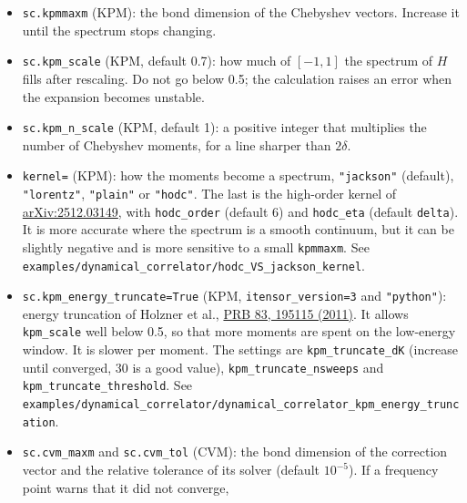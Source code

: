 \documentclass[11pt]{article}
\providecommand{\tightlist}{\setlength{\itemsep}{0pt}\setlength{\parskip}{0pt}}
\begin{document}
\begin{itemize}
\tightlist
\item
  \texttt{sc.\allowbreak{}kpmmaxm} (KPM): the bond dimension of the Chebyshev vectors. Increase
  it until the spectrum stops changing.
\item
  \texttt{sc.\allowbreak{}kpm\_\allowbreak{}scale} (KPM, default 0.7): how much of \([-1,1]\) the spectrum of
  \(H\) fills after rescaling. Do not go below 0.5; the calculation raises an
  error when the expansion becomes unstable.
\item
  \texttt{sc.\allowbreak{}kpm\_\allowbreak{}n\_\allowbreak{}scale} (KPM, default 1): a positive integer that multiplies the
  number of Chebyshev moments, for a line sharper than \(2\delta\).
\item
  \texttt{kernel=} (KPM): how the moments become a spectrum, \texttt{"jackson"}
  (default), \texttt{"lorentz"}, \texttt{"plain"} or \texttt{"hodc"}. The last is the high-order
  kernel of \href{https://arxiv.org/abs/2512.03149}{arXiv:2512.03149}, with
  \texttt{hodc\_\allowbreak{}order} (default 6) and \texttt{hodc\_\allowbreak{}eta} (default \texttt{delta}). It is more
  accurate where the spectrum is a smooth continuum, but it can be slightly
  negative and is more sensitive to a small \texttt{kpmmaxm}. See
  \texttt{examples/dynamical\_\allowbreak{}correlator/hodc\_\allowbreak{}VS\_\allowbreak{}jackson\_\allowbreak{}kernel}.
\item
  \texttt{sc.\allowbreak{}kpm\_\allowbreak{}energy\_\allowbreak{}truncate=True} (KPM, \texttt{itensor\_\allowbreak{}version=3} and \texttt{"python"}):
  energy truncation of Holzner et al.,
  \href{https://doi.org/10.1103/PhysRevB.83.195115}{PRB 83, 195115 (2011)}. It
  allows \texttt{kpm\_\allowbreak{}scale} well below 0.5, so that more moments are spent on the
  low-energy window. It is slower per moment. The settings are
  \texttt{kpm\_\allowbreak{}truncate\_\allowbreak{}dK} (increase until converged, 30 is a good value),
  \texttt{kpm\_\allowbreak{}truncate\_\allowbreak{}nsweeps} and \texttt{kpm\_\allowbreak{}truncate\_\allowbreak{}threshold}. See
  \texttt{examples/dynamical\_\allowbreak{}correlator/dynamical\_\allowbreak{}correlator\_\allowbreak{}kpm\_\allowbreak{}energy\_\allowbreak{}truncation}.
\item
  \texttt{sc.\allowbreak{}cvm\_\allowbreak{}maxm} and \texttt{sc.\allowbreak{}cvm\_\allowbreak{}tol} (CVM): the bond dimension of the
  correction vector and the relative tolerance of its solver (default
  \(10^{-5}\)). If a frequency point warns that it did not converge,

\end{itemize}
\end{document}
